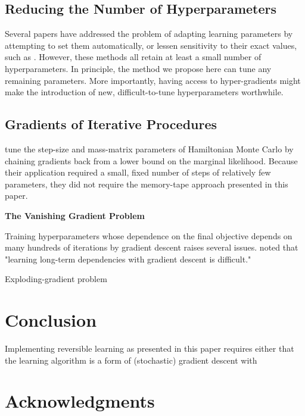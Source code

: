 \documentclass{article}
\begin{document}
\subsection{Reducing the Number of Hyperparameters}
Several papers have addressed the problem of adapting learning parameters by attempting to set them automatically, or lessen sensitivity to their exact values, such as \cite{schaul2012no, Adam14, Adasecant14, Hotswap14}.
However, these methods all retain at least a small number of hyperparameters.
In principle, the method we propose here can tune any remaining parameters.
More importantly, having access to hyper-gradients might make the introduction of new, difficult-to-tune hyperparameters worthwhile.

\subsection{Gradients of Iterative Procedures}

\citet{Bridging14} tune the step-size and mass-matrix parameters of Hamiltonian Monte Carlo by chaining gradients back from a lower bound on the marginal likelihood.
Because their application required a small, fixed number of steps of relatively few parameters, they did not require the memory-tape approach presented in this paper.

\textbf{The Vanishing Gradient Problem}

Training hyperparameters whose dependence on the final objective depends on many hundreds of iterations by gradient descent raises several issues.
\citet{bengio1994learning} noted that "learning long-term dependencies with gradient descent is difficult."


Exploding-gradient problem~\cite{pascanu2012understanding}

\section{Conclusion}

Implementing reversible learning as presented in this paper requires either that the learning algorithm is a form of (stochastic) gradient descent with

\section*{Acknowledgments} 




\end{document}
